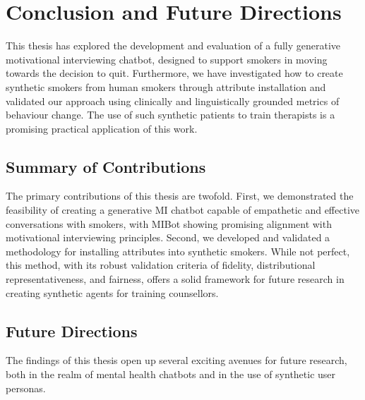 \chapter{Conclusion and Future Directions}
\label{ch:conclusion}

This thesis has explored the development and evaluation of a fully generative motivational interviewing chatbot, designed to support smokers in moving towards the decision to quit. Furthermore, we have investigated how to create synthetic smokers from human smokers through attribute installation and validated our approach using clinically and linguistically grounded metrics of behaviour change. The use of such synthetic patients to train therapists is a promising practical application of this work.


\section{Summary of Contributions}

The primary contributions of this thesis are twofold. First, we demonstrated the feasibility of creating a generative MI chatbot capable of empathetic and effective conversations with smokers, with MIBot showing promising alignment with motivational interviewing principles. Second, we developed and validated a methodology for installing attributes into synthetic smokers. While not perfect, this method, with its robust validation criteria of fidelity, distributional representativeness, and fairness, offers a solid framework for future research in creating synthetic agents for training counsellors.


\section{Future Directions}
The findings of this thesis open up several exciting avenues for future research, both in the realm of mental health chatbots and in the use of synthetic user personas.

